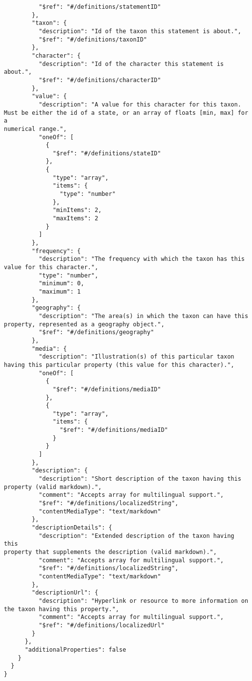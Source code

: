 \documentclass[10pt,letterpaper]{article}
\begin{document}
\begin{verbatim}
          "$ref": "#/definitions/statementID"
        },
        "taxon": {
          "description": "Id of the taxon this statement is about.",
          "$ref": "#/definitions/taxonID"
        },
        "character": {
          "description": "Id of the character this statement is
about.",
          "$ref": "#/definitions/characterID"
        },
        "value": {
          "description": "A value for this character for this taxon.
Must be either the id of a state, or an array of floats [min, max] for a
numerical range.",
          "oneOf": [
            {
              "$ref": "#/definitions/stateID"
            },
            {
              "type": "array",
              "items": {
                "type": "number"
              },
              "minItems": 2,
              "maxItems": 2
            }
          ]
        },
        "frequency": {
          "description": "The frequency with which the taxon has this
value for this character.",
          "type": "number",
          "minimum": 0,
          "maximum": 1
        },
        "geography": {
          "description": "The area(s) in which the taxon can have this
property, represented as a geography object.",
          "$ref": "#/definitions/geography"
        },
        "media": {
          "description": "Illustration(s) of this particular taxon
having this particular property (this value for this character).",
          "oneOf": [
            {
              "$ref": "#/definitions/mediaID"
            },
            {
              "type": "array",
              "items": {
                "$ref": "#/definitions/mediaID"
              }
            }
          ]
        },
        "description": {
          "description": "Short description of the taxon having this
property (valid markdown).",
          "comment": "Accepts array for multilingual support.",
          "$ref": "#/definitions/localizedString",
          "contentMediaType": "text/markdown"
        },
        "descriptionDetails": {
          "description": "Extended description of the taxon having this
property that supplements the description (valid markdown).",
          "comment": "Accepts array for multilingual support.",
          "$ref": "#/definitions/localizedString",
          "contentMediaType": "text/markdown"
        },
        "descriptionUrl": {
          "description": "Hyperlink or resource to more information on
the taxon having this property.",
          "comment": "Accepts array for multilingual support.",
          "$ref": "#/definitions/localizedUrl"
        }
      },
      "additionalProperties": false
    }
  }
}

\end{verbatim}
\nolinenumbers
\end{document}
